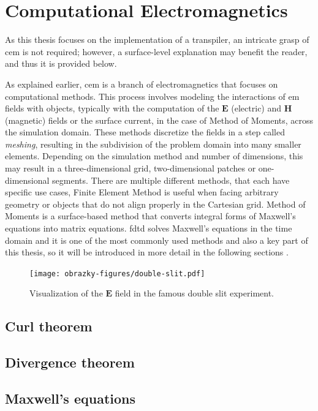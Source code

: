 \section{Computational Electromagnetics}
As this thesis focuses on the implementation of a transpiler, an intricate grasp of \gls{cem} is not required; however, a surface-level explanation may benefit the reader, and thus it is provided below.

As explained earlier, \gls{cem} is a branch of electromagnetics that focuses on computational methods. This process involves modeling the interactions of \gls{em} fields with objects, typically with the computation of the $\mathbf{E}$ (electric) and $\mathbf{H}$ (magnetic) fields or the surface current, in the case of Method of Moments, across the simulation domain. These methods discretize the fields in a step called \textit{meshing}, resulting in the subdivision of the problem domain into many smaller elements. Depending on the simulation method and number of dimensions, this may result in a three-dimensional grid, two-dimensional patches or one-dimensional segments. There are multiple different methods, that each have specific use cases, Finite Element Method is useful when facing arbitrary geometry or objects that do not align properly in the Cartesian grid. Method of Moments is a surface-based method that converts integral forms of Maxwell’s equations into matrix equations. \gls{fdtd} solves Maxwell’s equations in the time domain and it is one of the most commonly used methods and also a key part of this thesis, so it will be introduced in more detail in the following sections \cite{davidson_2010}.


\begin{figure}[H]
  \label{fig:chomsky-hierarchy}
  \centering
  \texttt{[image: obrazky-figures/double-slit.pdf]}
  \caption{Visualization of the $\mathbf{E}$ field in the famous double slit experiment.}
\end{figure}




\subsection*{Curl theorem}
\subsection*{Divergence theorem}
\subsection*{Maxwell's equations}

